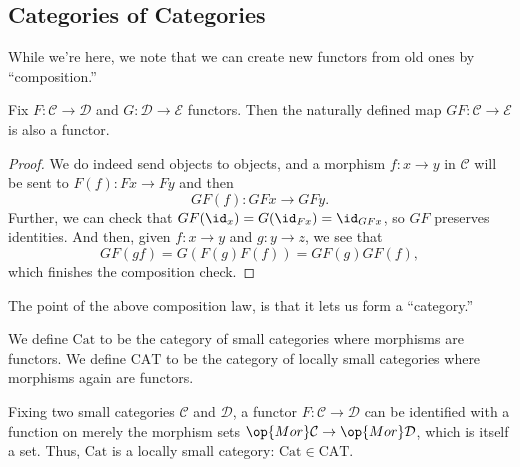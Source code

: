 \documentclass[../notes.tex]{subfiles}
\begin{document}
\subsection{Categories of Categories}
While we're here, we note that we can create new functors from old ones by ``composition.''
\begin{proposition}
	Fix $F:\mathcal C\to\mathcal D$ and $G:\mathcal D\to\mathcal E$ functors. Then the naturally defined map $GF:\mathcal C\to\mathcal E$ is also a functor.
\end{proposition}
\begin{proof}
	We do indeed send objects to objects, and a morphism $f:x\to y$ in $\mathcal C$ will be sent to $F(f):Fx\to Fy$ and then
	\[GF(f):GFx\to GFy.\]
	Further, we can check that $GF(\id_x)=G(\id_{Fx})=\id_{GFx}$, so $GF$ preserves identities. And then, given $f:x\to y$ and $g:y\to z$, we see that
	\[GF(gf)=G(F(g)F(f))=GF(g)GF(f),\]
	which finishes the composition check.
\end{proof}
The point of the above composition law, is that it lets us form a ``category.''
\begin{definition}
	We define $\mathrm{Cat}$ to be the category of small categories where morphisms are functors. We define $\mathrm{CAT}$ to be the category of locally small categories where morphisms again are functors.
\end{definition}
\begin{remark}
	Fixing two small categories $\mathcal C$ and $\mathcal D$, a functor $F:\mathcal C\to\mathcal D$ can be identified with a function on merely the morphism sets $\op{Mor}\mathcal C\to\op{Mor}\mathcal D$, which is itself a set. Thus, $\mathrm{Cat}$ is a locally small category: $\mathrm{Cat}\in\mathrm{CAT}$.
\end{remark}
\end{document}
